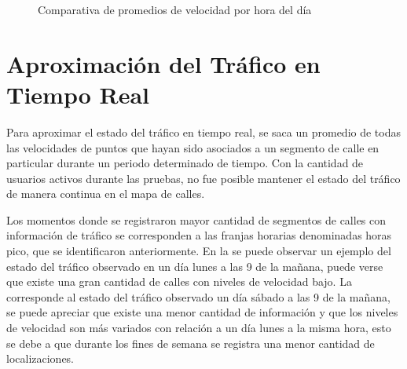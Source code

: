 \begin{figure}[h]
\centering
{}
\caption[Comparativa de promedios de velocidad]{Comparativa de promedios de velocidad por hora del día}
\label{fig:promedio_velocidad_es_fs}
\end{figure}

\section{Aproximación del Tráfico en Tiempo Real}

Para aproximar el estado del tráfico en tiempo real, se saca un promedio de todas las velocidades de puntos que hayan sido asociados a un segmento de calle en particular durante un periodo determinado de tiempo. Con la cantidad de usuarios activos durante las pruebas, no fue posible mantener el estado del tráfico de manera continua en el mapa de calles.

Los momentos donde se registraron mayor cantidad de segmentos de calles con información de tráfico se corresponden a las franjas horarias denominadas horas pico, que se identificaron anteriormente. En la  se puede observar un ejemplo del estado del tráfico observado en un día lunes a las 9 de la mañana, puede verse que existe una gran cantidad de calles con niveles de velocidad bajo. La  corresponde al estado del tráfico observado un día sábado a las 9 de la mañana, se puede apreciar que existe una menor cantidad de información y que los niveles de velocidad son más variados con relación a un día lunes a la misma hora, esto se debe a que durante los fines de semana se registra una menor cantidad de localizaciones.

